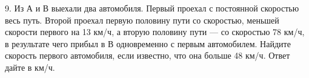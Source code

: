 9. Из А и В выехали два автомобиля. Первый проехал с постоянной скоростью весь путь. Второй проехал первую половину пути со скоростью, меньшей скорости первого на 13 км/ч, а вторую половину пути --- со скоростью 78 км/ч, в результате чего прибыл в В одновременно с первым автомобилем. Найдите скорость первого автомобиля, если известно, что она больше 48 км/ч. Ответ дайте в км/ч.\\
